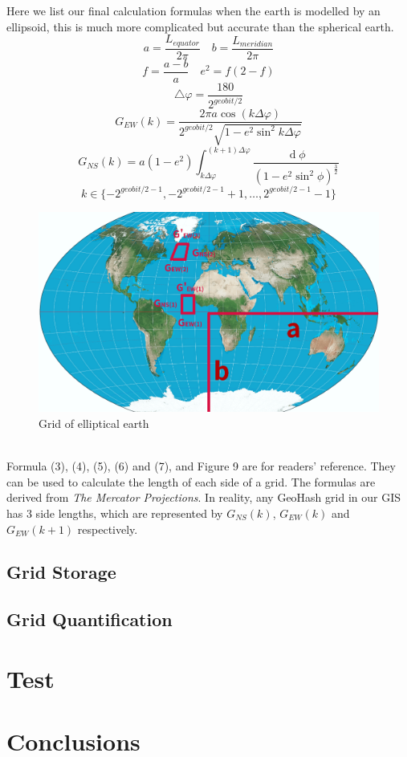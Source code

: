 \documentclass[sigplan,screen]{acmart}
\begin{document}
Here we list our final calculation formulas when the earth is modelled by an ellipsoid, this is much more complicated but accurate than the spherical earth.
\begin{equation}
	a=\frac{L_{equator}}{2\pi}\quad b=\frac{L_{meridian}}{2\pi}
\end{equation}
\begin{equation}
	f=\frac{a-b}{a}\quad e^2=f(2-f)
\end{equation}
\begin{equation}
	\bigtriangleup\varphi=\frac{180}{2^{geobit/2}}
\end{equation}
\begin{equation}
	G_{EW}(k)=\frac{2\pi a\cos(k\Delta\varphi)}{2^{geobit/2}\sqrt{1-e^2\sin^2k\Delta\varphi}}
\end{equation}
\begin{equation}
	G_{NS}(k)=a(1-e^2)\int_{k\Delta\varphi}^{(k+1)\Delta\varphi}\frac{\operatorname d\phi}{{(1-e^2\sin^2\phi)}^\frac32}
\end{equation}
\begin{equation}
	k\in\{-2^{geobit/2-1}, -2^{geobit/2-1}+1, \ldots, 2^{geobit/2-1}-1\}
\end{equation}
\begin{figure}[htb]
	\centering\includegraphics[width=\linewidth]{earth.png}
	\caption{Grid of elliptical earth}
\end{figure}
\\
Formula (3), (4), (5), (6) and (7), and Figure 9 are for readers' reference.
They can be used to calculate the length of each side of a grid.
The formulas are derived from \textit{The Mercator Projections}\cite{osborne2013mercator}.
In reality, any GeoHash grid in our GIS has 3 side lengths, which are represented by $G_{NS}(k)$, $G_{EW}(k)$ and $G_{EW}(k+1)$ respectively.
\subsection{Grid Storage}
\subsection{Grid Quantification}
\section{Test}
\section{Conclusions}



\end{document}
